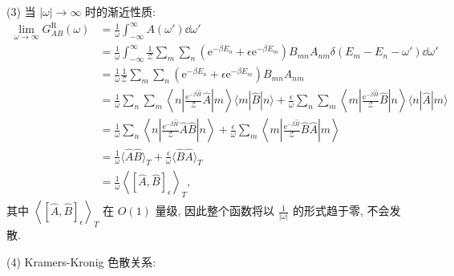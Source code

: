     (3)  当 $|\omega|\to \infty$ 时的渐近性质:
    \begin{equation}
        \begin{aligned}
            \lim_{\omega\to\infty}G_{AB}^{\mathrm{R}}(\omega)&=\frac{1}{\omega}\int_{-\infty}^{\infty}A(\omega')\dd\omega'\\
            &=\frac{1}{\omega}\int_{-\infty}^{\infty}\frac{1}{\mathcal{Z}}\sum_m\sum_n\left( \mathrm{e}^{-\beta E_n}+\epsilon \mathrm{e}^{-\beta E_m} \right) B_{mn}A_{nm}\delta(E_m-E_n-\omega')\dd\omega'\\
            &=\frac{1}{\omega}\frac{1}{\mathcal{Z}}\sum_m\sum_n\left( \mathrm{e}^{-\beta E_n}+\epsilon \mathrm{e}^{-\beta E_m} \right) B_{mn}A_{nm}\\
            &=\frac{1}{\omega}\sum_n\sum_m \left\langle n\left|\frac{\mathrm{e}^{-\beta\hat H}}{\mathcal{Z}}\hat A\right|m \right\rangle \langle m|\hat B |n \rangle +\frac{\epsilon}{\omega}\sum_n\sum_m \left\langle m\left|\frac{\mathrm{e}^{-\beta\hat H}}{\mathcal{Z}}\hat B\right|n \right\rangle \langle n|\hat A |m \rangle\\
            &=\frac{1}{\omega}\sum_n\left\langle  n \left| \frac{\mathrm{e}^{-\beta\hat H}}{\mathcal{Z}}\hat A\hat B \right| n \right\rangle +\frac{\epsilon}{\omega}\sum_m\left\langle  m \left| \frac{\mathrm{e}^{-\beta\hat H}}{\mathcal{Z}}\hat B\hat A \right| m \right\rangle \\
            &=\frac{1}{\omega}\langle \hat{A}\hat{B} \rangle_T+\frac{\epsilon}{\omega}\langle \hat B\hat A \rangle_T\\
            &=\frac{1}{\omega}\left\langle \left[ \hat A,\hat B \right]_\epsilon \right\rangle_T,
        \end{aligned}
    \end{equation} 
    其中 $\left\langle \left[ \hat A,\hat B \right]_\epsilon \right\rangle_T$ 在 $O(1)$ 量级, 因此整个函数将以 $\displaystyle{\frac{1}{|\omega|}}$ 的形式趋于零, 不会发散.
  
    (4)  Kramers-Kronig 色散关系:
    
